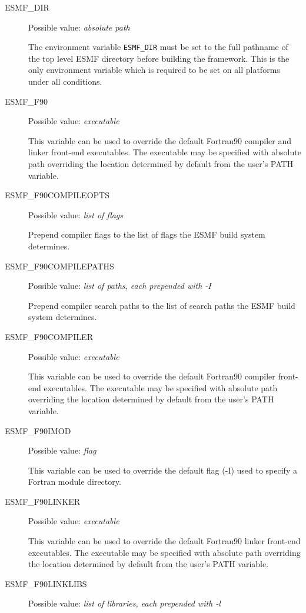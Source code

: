 \begin{description}
\item[ESMF\_DIR]
Possible value: {\em absolute path}

The environment variable {\tt ESMF\_DIR} must be set to the full pathname 
of the top level ESMF directory before building the framework. This is the 
only environment variable which is required to be set on all platforms under 
all conditions.

\item[ESMF\_F90]
Possible value: {\em executable}

This variable can be used to override the default Fortran90 compiler and linker
front-end executables. The executable may be specified with absolute path
overriding the location determined by default from the user's PATH variable.

\item[ESMF\_F90COMPILEOPTS]
Possible value: {\em list of flags}

Prepend compiler flags to the list of flags the ESMF build system determines.

\item[ESMF\_F90COMPILEPATHS]
Possible value: {\em list of paths, each prepended with -I}

Prepend compiler search paths to the list of search paths the ESMF build system
determines.

\item[ESMF\_F90COMPILER]
Possible value: {\em executable}

This variable can be used to override the default Fortran90 compiler
front-end executables. The executable may be specified with absolute path
overriding the location determined by default from the user's PATH variable.

\item[ESMF\_F90IMOD]
Possible value: {\em flag}

This variable can be used to override the default flag (-I) used to specify a
Fortran module directory.

\item[ESMF\_F90LINKER]
Possible value: {\em executable}

This variable can be used to override the default Fortran90 linker
front-end executables. The executable may be specified with absolute path
overriding the location determined by default from the user's PATH variable.

\item[ESMF\_F90LINKLIBS]
Possible value: {\em list of libraries, each prepended with -l}


\end{description}
